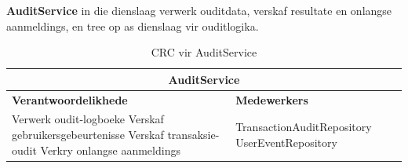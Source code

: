 \textbf{AuditService} in die dienslaag verwerk ouditdata, verskaf resultate en onlangse aanmeldings, en tree op as dienslaag vir ouditlogika.
\begin{table}[H]
\centering
\begin{tabular}{|p{}|p{}|}
    \hline
    \multicolumn{2}{|c|}{\textbf{AuditService}} \\
    \hline
    \textbf{Verantwoordelikhede} & \textbf{Medewerkers} \\
    \hline
    Verwerk oudit-logboeke \newline
    Verskaf gebruikersgebeurtenisse \newline
    Verskaf transaksie-oudit \newline
    Verkry onlangse aanmeldings
    &
    TransactionAuditRepository \newline
    UserEventRepository \\
    \hline
\end{tabular}
\caption{CRC vir AuditService}
\label{tab:crc_audit_service}
\end{table}

